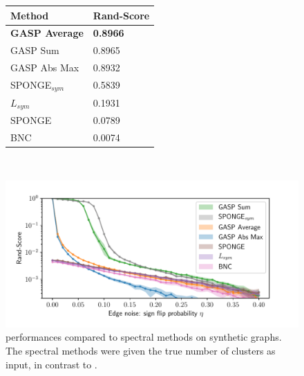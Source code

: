 \begin{figure}[t]
\centering
\begin{minipage}[t]{0.48\textwidth}
\vspace{0pt}
\centering
\begin{tabular}[t]{L{9em} M{7em}}
           Method & Rand-Score \\ \midrule
           \textbf{GASP Average} & \textbf{0.8966} \\
GASP Sum & 0.8965 \\
GASP Abs Max & 0.8932 \\
SPONGE$_{sym}$ \cite{Cucuringu2019SPONGEAG} & 0.5839\\
$L_{sym}$ \cite{kunegis2010spectral} & 0.1931 \\
SPONGE \cite{Cucuringu2019SPONGEAG} & 0.0789 \\
BNC \cite{chiang2012scalable} & 0.0074 \\
        \end{tabular}
    \label{tab:cremi_spectral_experiments}
\end{minipage}\\\vspace{2em}
\begin{minipage}[t]{0.48\textwidth}
\vspace{0pt}
\centering
        \includegraphics[width=1.\textwidth,trim=0.25in 0.25in 0.68in 0.36in,clip]{./figs/SSBM_experiments.pdf} %
        \caption{\algname{} performances compared to spectral methods on synthetic graphs. The spectral methods were given the true number of clusters as input, in contrast to \algname{}.}
    \label{fig:SSBM_spectral_experiments}
\end{minipage}
\end{figure}


